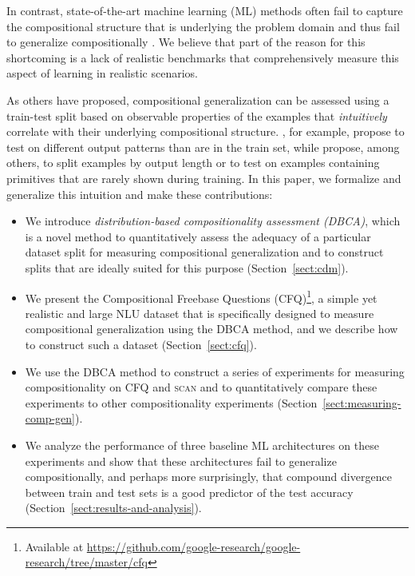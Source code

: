 \documentclass[letterpaper]{article}
\newcommand{\SCAN}{\textsc{scan}}
\begin{document}
In contrast, state-of-the-art machine learning (ML) methods often fail to capture the compositional structure that is underlying the problem domain and thus fail to generalize compositionally \citep{Lake2018GeneralizationWS,bastings2018jump,rearranging,YBcomp2019,CLEVR}.
We believe that part of the reason for this shortcoming is a lack of realistic benchmarks that comprehensively measure this aspect of learning in realistic scenarios. 

As others have proposed, compositional generalization can be assessed using a train-test split based on observable properties of the examples that {\em intuitively} correlate with their underlying compositional structure. \citet{ACL2018sql}, for example, propose to test on different output patterns than are in the train set, while \citet{Lake2018GeneralizationWS} propose, among others, to split examples by output length or to test on examples containing primitives that are rarely shown during training.
In this paper, we formalize and generalize this intuition and make these contributions:
\begin{itemize}
    \item We introduce {\em distribution-based compositionality assessment (DBCA)}, which is a novel method to quantitatively assess the adequacy of a particular dataset split for measuring compositional generalization and to construct splits that are ideally suited for this purpose (Section~\ref{sect:cdm}).
    \item We present the Compositional Freebase Questions (CFQ)\footnote{Available at \url{https://github.com/google-research/google-research/tree/master/cfq}}, a simple yet realistic and large NLU dataset that is specifically designed to measure compositional generalization using the DBCA method, and we describe how to construct such a dataset (Section~\ref{sect:cfq}).
    \item We use the DBCA method to construct a series of experiments for measuring compositionality on CFQ and \SCAN{} \citep{Lake2018GeneralizationWS} and to quantitatively compare these experiments to other compositionality experiments (Section~\ref{sect:measuring-comp-gen}).
    \item We analyze the performance of three baseline ML architectures on these experiments and show that these architectures fail to generalize compositionally, and perhaps more surprisingly, that compound divergence between train and test sets is a good predictor of the test accuracy (Section~\ref{sect:results-and-analysis}).
\vspace{-2ex}\end{itemize}
\end{document}
